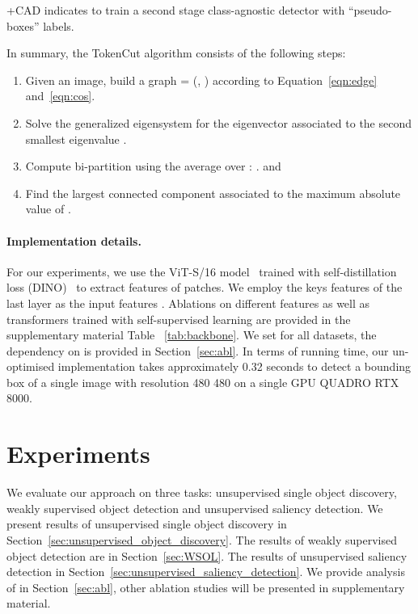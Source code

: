\documentclass[twocolumn]{article}
\begin{document}
\begin{table*}[!t]
\begin{center}
{\begin{tabular}{lcllll}
\end{tabular}}
  
  \footnotesize{ +CAD indicates to train a second stage class-agnostic detector with ``pseudo-boxes'' labels.} 
  \label{tab:object_dis}
\end{center}

\end{table*}

In summary, the TokenCut algorithm consists of the following steps:

\begin{enumerate}
    
	\item Given an image, build a graph  = (, ) according to Equation~\ref{eqn:edge} and~\ref{eqn:cos}.
	 
	\item Solve the generalized
	eigensystem  for the eigenvector associated to the second smallest eigenvalue .
	 
	\item Compute bi-partition using the average over : .  and 
	 
	\item Find the largest connected component associated to the maximum absolute value of  .
	
\end{enumerate}
    

\paragraph{Implementation details.}
For our experiments, we use the ViT-S/16 model~\cite{dosovitskiy2020image} trained with self-distillation  loss (DINO)~\cite{caron2021emerging} to extract features of patches. 
We employ the keys features of the last layer as the input features . Ablations on different features as well as  transformers trained with self-supervised learning are  provided in the supplementary material Table ~\ref{tab:backbone}. We set  for all datasets, the dependency on  is provided in Section~\ref{sec:abl}. In terms of running time, our un-optimised implementation takes approximately 0.32 seconds to detect a bounding box of a single image with resolution 480  480 on a single GPU QUADRO RTX 8000. 



\section{Experiments}
\label{sec:exp}
We evaluate our approach on three tasks: unsupervised single object discovery, weakly supervised object detection and unsupervised saliency detection. We present results of unsupervised single object discovery in Section~\ref{sec:unsupervised_object_discovery}. The results of weakly supervised object detection are in Section~\ref{sec:WSOL}. The results of unsupervised saliency detection in Section~\ref{sec:unsupervised_saliency_detection}. We provide analysis of  in Section~\ref{sec:abl}, other ablation studies will be presented in supplementary material.
\end{document}
